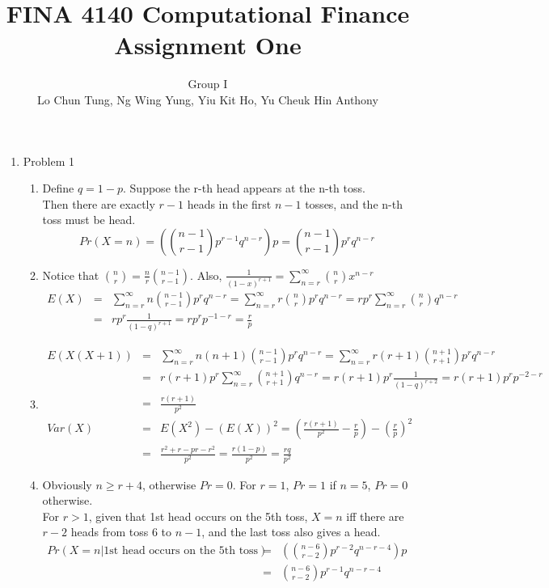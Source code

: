 \documentclass[leqno,12pt]{article}
\title{\large FINA 4140 Computational Finance Assignment One}
\author{Group I\\
Lo Chun Tung, Ng Wing Yung, Yiu Kit Ho, Yu Cheuk Hin Anthony}
\begin{document}
\begin{enumerate}
\item Problem 1
\begin{enumerate}
\item Define $q=1-p$. Suppose the r-th head appears at the n-th toss. \\
Then there are exactly $r-1$ heads in the first $n-1$ tosses, and the n-th toss must be head.
\[ Pr(X=n)=\left(\binom{n-1}{r-1}p^{r-1}q^{n-r}\right)p=\binom{n-1}{r-1}p^rq^{n-r} \]
\item Notice that $\binom{n}{r}=\frac{n}{r}\binom{n-1}{r-1}$. Also, $\frac{1}{(1-x)^{r+1}}=\displaystyle\sum_{n=r}^{\infty}\binom{n}{r}x^{n-r}$
\begin{eqnarray*}
E(X)&=&\displaystyle\sum_{n=r}^{\infty}n\binom{n-1}{r-1}p^rq^{n-r}=\displaystyle\sum_{n=r}^{\infty}r\binom{n}{r}p^rq^{n-r}=rp^r\displaystyle\sum_{n=r}^{\infty}\binom{n}{r}q^{n-r}\\
&=&rp^r\frac{1}{(1-q)^{r+1}}=rp^rp^{-1-r}=\frac{r}{p}
\end{eqnarray*}
\item \begin{eqnarray*}
E(X(X+1))&=&\displaystyle\sum_{n=r}^{\infty}n(n+1)\binom{n-1}{r-1}p^rq^{n-r}=\displaystyle\sum_{n=r}^{\infty}r(r+1)\binom{n+1}{r+1}p^rq^{n-r}\\
&=&r(r+1)p^r\displaystyle\sum_{n=r}^{\infty}\binom{n+1}{r+1}q^{n-r}=r(r+1)p^r\frac{1}{(1-q)^{r+2}}=r(r+1)p^rp^{-2-r}\\
&=&\frac{r(r+1)}{p^2}\\
Var(X)&=&E(X^2)-(E(X))^2=\left(\frac{r(r+1)}{p^2}-\frac{r}{p}\right)-\left(\frac{r}{p}\right)^2\\
&=&\frac{r^2+r-pr-r^2}{p^2}=\frac{r(1-p)}{p^2}=\frac{rq}{p^2}
\end{eqnarray*}
\item Obviously $n\geq r+4$, otherwise $Pr=0$. For $r=1$, $Pr=1$ if $n=5$, $Pr=0$ otherwise.\\
For $r>1$, given that 1st head occurs on the 5th toss, $X=n$ iff there are $r-2$ heads from toss 6 to $n-1$, and the last toss also gives a head.
\begin{eqnarray*}
Pr(X=n|\text{1st head occurs on the 5th toss})&=&\left(\binom{n-6}{r-2}p^{r-2}q^{n-r-4}\right)p\\
&=&\binom{n-6}{r-2}p^{r-1}q^{n-r-4}
\end{eqnarray*}\\
\end{enumerate}

\pagebreak


\end{enumerate}
\end{document}
